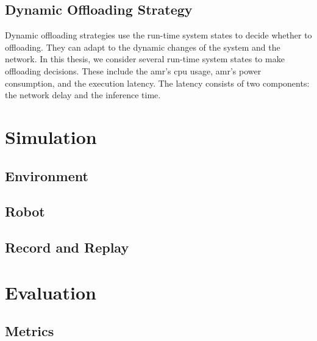 \subsection{Dynamic Offloading Strategy}

Dynamic offloading strategies use the run-time system states to decide whether to offloading. They can adapt to the dynamic changes of the system and the network. In this thesis, we consider several run-time system states to make offloading decisions. These include the \gls{amr}'s \gls{cpu} usage, \gls{amr}'s power consumption, and the execution latency. The latency consists of two components: the network delay and the inference time. 

\section{Simulation}\label{sec:general_setup:simulation}

\subsection{Environment}


\subsection{Robot}


\subsection{Record and Replay}


\section{Evaluation}\label{sec:general_setup:evaluation}

\subsection{Metrics}


